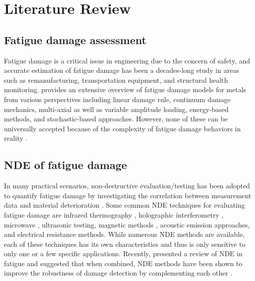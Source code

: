\chapter{Literature Review}
\label{chap: litrev}

\section{Fatigue damage assessment}
Fatigue damage is a critical issue in engineering due to the concern of safety, and accurate estimation of fatigue damage has been a decades-long study in areas such as remanufacturing, transportation equipment, and structural health monitoring.  provides an extensive overview of fatigue damage models for metals from various perspectives including linear damage rule, continuum damage mechanics, multi-axial as well as variable amplitude loading, energy-based methods, and stochastic-based approaches. However, none of these can be universally accepted because of the complexity of fatigue damage behaviors in reality \cite{fatigue-review-Santecchia2016}.

\section{NDE of fatigue damage}
In many practical scenarios, non-destructive evaluation/testing has been adopted to quantify fatigue damage by investigating the correlation between measurement data and material deterioration \cite{nde-review-ACHENBACH200013}. Some common NDE techniques for evaluating fatigue damage are infrared thermography \cite{nde-thermo-FAN20121}, holographic interferometry \cite{nde-dic}, microwave \cite{nde-microwave}, ultrasonic testing, magnetic methods \cite{nde-magnetic}, acoustic emission approaches, and electrical resistance methods. While numerous NDE methods are available, each of these techniques has its own characteristics and thus is only sensitive to only one or a few specific applications. Recently,  presented a review of NDE in fatigue and suggested that when combined, NDE methods have been shown to improve the robustness of damage detection by complementing each other \cite{nde-review-WISNER2020}.

